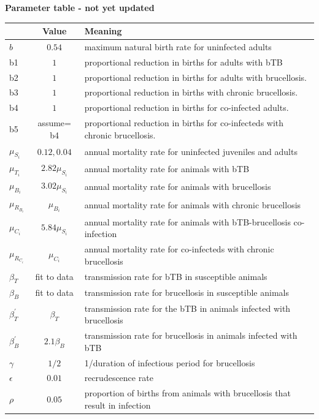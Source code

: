 \documentclass[letterpaper,12pt]{article}
\begin{document}
\textbf{Parameter table - not yet updated}
\begin{table}[H] %
\newcommand{\head}[1]{\textnormal{\textbf{#1}}}
\small
\begin{tabular}{lcp{12cm}}
\hline
\head{ } & \head{Value} & \head{Meaning}\\
\hline
$b$ & $0.54$ &  maximum natural birth rate for uninfected adults  \\
b1 & $1$ &  proportional reduction in births for adults with bTB \\
b2 & $1$ & proportional reduction in births for adults with brucellosis.  \\
b3 & $1$ & proportional reduction in births with chronic brucellosis.  \\
b4 & $1$ & proportional reduction in births for co-infected adults. \\
b5 & assume= b4 & proportional reduction in births for co-infecteds with chronic brucellosis.  \\
$\mu_{S_i} $ & $ 0.12, 0.04$ & annual mortality rate for uninfected juveniles and adults\\
$\mu_{T_i} $& $2.82 \mu_{S_i} $ & annual mortality rate for animals with bTB \\
$\mu_{B_i} $& $3.02 \mu_{S_i} $ & annual mortality rate for animals with brucellosis \\ 
$\mu_{R_{B_i}} $& $\mu_{B_i}$ & annual mortality rate for animals with chronic brucellosis \\ 
$\mu_{C_i}$ & $5.84 \mu_{S_i} $ & annual mortality rate for animals with bTB-brucellosis co-infection \\ 
$\mu_{R_{C_i}}$ &  $\mu_{C_i}$ & annual mortality rate for co-infecteds with chronic brucellosis \\ 
$\beta_T $ & fit to data & transmission rate for bTB in susceptible animals \\
$\beta_B $ & fit to data & transmission rate for brucellosis in susceptible animals \\
$\beta_{T}^{'}$ & $\beta_T$ & transmission rate for the bTB in animals infected with brucellosis \\
$\beta_{B}^{'}$ & $2.1 \beta_B$ & transmission rate for brucellosis in animals infected with bTB \\
$\gamma$& $ 1/2 $& 1/duration of infectious period for brucellosis \\
$\epsilon$& $0.01$ & recrudescence rate \\
$\rho$& $0.05$ & proportion of births from animals with brucellosis that result in infection \\
\hline 
\end{tabular}
\end{table}
\caption{Parameter table- not yet updated}
\\
\end{document}
